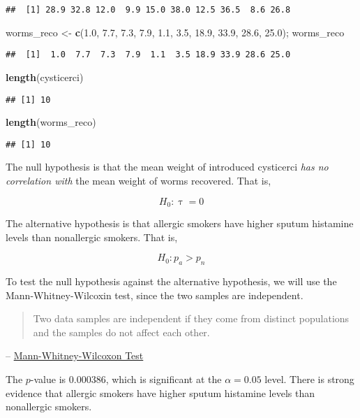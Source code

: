 \documentclass[]{article}
\newenvironment{Shaded}{\begin{snugshade}}{\end{snugshade}}
\newcommand{\FloatTok}[1]{\textcolor[rgb]{0.00,0.00,0.81}{#1}}
\newcommand{\KeywordTok}[1]{\textcolor[rgb]{0.13,0.29,0.53}{\textbf{#1}}}
\newcommand{\NormalTok}[1]{#1}
\newcommand{\StringTok}[1]{\textcolor[rgb]{0.31,0.60,0.02}{#1}}
\begin{document}
\begin{verbatim}
##  [1] 28.9 32.8 12.0  9.9 15.0 38.0 12.5 36.5  8.6 26.8
\end{verbatim}

\begin{Shaded}
\begin{Highlighting}[]
\NormalTok{worms_reco <-}\StringTok{ }\KeywordTok{c}\NormalTok{(}\FloatTok{1.0}\NormalTok{, }\FloatTok{7.7}\NormalTok{, }\FloatTok{7.3}\NormalTok{, }\FloatTok{7.9}\NormalTok{, }\FloatTok{1.1}\NormalTok{, }\FloatTok{3.5}\NormalTok{, }\FloatTok{18.9}\NormalTok{, }\FloatTok{33.9}\NormalTok{, }\FloatTok{28.6}\NormalTok{, }\FloatTok{25.0}\NormalTok{); worms_reco}
\end{Highlighting}
\end{Shaded}

\begin{verbatim}
##  [1]  1.0  7.7  7.3  7.9  1.1  3.5 18.9 33.9 28.6 25.0
\end{verbatim}

\begin{Shaded}
\begin{Highlighting}[]
\KeywordTok{length}\NormalTok{(cysticerci)}
\end{Highlighting}
\end{Shaded}

\begin{verbatim}
## [1] 10
\end{verbatim}

\begin{Shaded}
\begin{Highlighting}[]
\KeywordTok{length}\NormalTok{(worms_reco)}
\end{Highlighting}
\end{Shaded}

\begin{verbatim}
## [1] 10
\end{verbatim}

The null hypothesis is that the mean weight of introduced cysticerci
\emph{has no correlation with} the mean weight of worms recovered. That
is,

\[
    H_0: \uptau = 0
\]

The alternative hypothesis is that allergic smokers have higher sputum
histamine levels than nonallergic smokers. That is,

\[
    H_0: p_a > p_n
\]

To test the null hypothesis against the alternative hypothesis, we will
use the Mann-Whitney-Wilcoxin test, since the two samples are
independent.

\begin{quote}
Two data samples are independent if they come from distinct populations
and the samples do not affect each other.
\end{quote}

--
\href{http://www.r-tutor.com/elementary-statistics/non-parametric-methods/mann-whitney-wilcoxon-test}{Mann-Whitney-Wilcoxon
Test}

The \(p\)-value is \(0.000386\), which is significant at the
\(\alpha = 0.05\) level. There is strong evidence that allergic smokers
have higher sputum histamine levels than nonallergic smokers.
\end{document}

